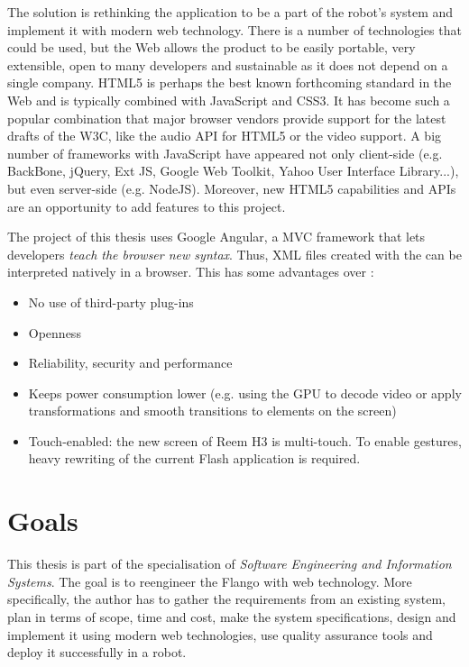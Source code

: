 The solution is rethinking the application to be a part of the robot's system and implement it with modern web technology.
There is a number of technologies that could be used, but the Web allows the product to be easily portable, very extensible, open to many developers and sustainable as it does not depend on a single company.
\ac{HTML5} is perhaps the best known forthcoming standard in the Web and is typically combined with JavaScript and \ac{CSS3}. 
It has become such a popular combination that major browser vendors provide support for the latest drafts of the \ac{W3C}, like the audio \ac{API} for \ac{HTML5} or the video support.
A big number of frameworks with JavaScript have appeared not only client-side (e.g. BackBone, jQuery, Ext JS, Google Web Toolkit, Yahoo User Interface Library...), but even server-side (e.g. NodeJS).
Moreover, new \ac{HTML5} capabilities and \acp{API} are an opportunity to add features to this project.

The project of this thesis uses Google Angular, a \ac{MVC} framework that lets developers \emph{teach the browser new syntax}. 
Thus, \ac{XML} files created with the \se can be interpreted natively in a browser. 
This has some advantages over \flash \cite{Jobs:ThoughtsOnFlash}:
\begin{itemize}
    \item No use of third-party plug-ins
    \item Openness
    \item Reliability, security and performance
    \item Keeps power consumption lower (e.g. using the GPU to decode video or apply transformations and smooth transitions to elements on the screen)
    \item Touch-enabled: the new screen of Reem H3 is multi-touch. To enable gestures, heavy rewriting of the current Flash application is required.
\end{itemize}


\section{Goals}
This thesis is part of the specialisation of \emph{Software Engineering and Information Systems}. 
The goal is to reengineer the Flango \cm with web technology.
More specifically, the author has to gather the requirements from an existing system, plan in terms of scope, time and cost, make the system specifications, design and implement it using modern web technologies, use quality assurance tools and deploy it successfully in a  robot.

